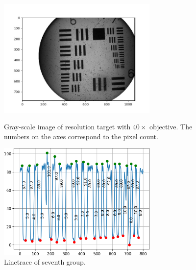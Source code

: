 \begin{figure}[h!]
    \centering
    \begin{minipage}{0.45\textwidth}
      \centering
      \includegraphics[width=0.7\textwidth,keepaspectratio]{afbeeldingen/process_visibility/m3_bw.jpg}
      \caption{Gray-scale image of resolution target with $40 \times$ objective. The numbers on the axes correspond to the pixel count.}
      \label{fig:resolution_target}
    \end{minipage}%
    \begin{minipage}{.45\textwidth}
      \centering
      \includegraphics[width=0.7\textwidth,keepaspectratio]{afbeeldingen/process_visibility/m3_rpg_7.png}
      \caption{Linetrace of seventh group.}
      \label{fig:linetrace}
    \end{minipage}
\end{figure}


